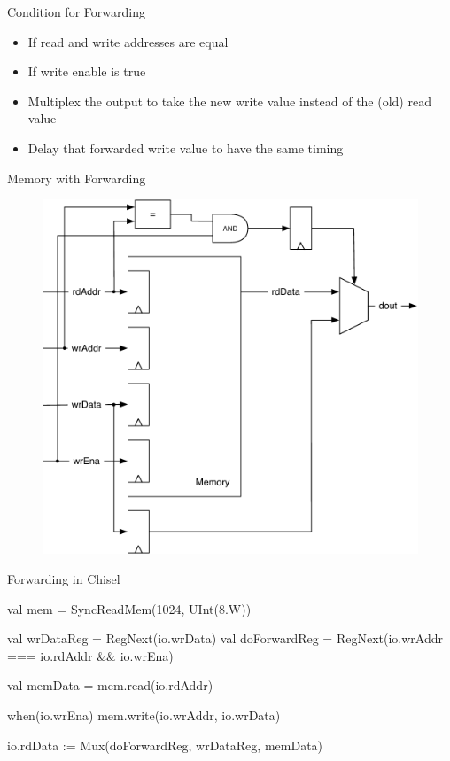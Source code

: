 \begin{frame}[fragile]{Condition for Forwarding}
\begin{itemize}
\item If read and write addresses are equal
\item If write enable is true
\item Multiplex the output to take the new write value instead of the (old) read value
\item Delay that forwarded write value to have the same timing
\end{itemize}
\end{frame}

\begin{frame}[fragile]{Memory with Forwarding}
\begin{figure}
  \includegraphics[scale=0.5]{../figures/memory-forwarding}
\end{figure}
\end{frame}

\begin{frame}[fragile]{Forwarding in Chisel}
\begin{chisel}
  val mem = SyncReadMem(1024, UInt(8.W))

  val wrDataReg = RegNext(io.wrData)
  val doForwardReg = RegNext(io.wrAddr === io.rdAddr && io.wrEna)

  val memData = mem.read(io.rdAddr)

  when(io.wrEna) {
    mem.write(io.wrAddr, io.wrData)
  }

  io.rdData := Mux(doForwardReg, wrDataReg, memData)
\end{chisel}
\end{frame}


